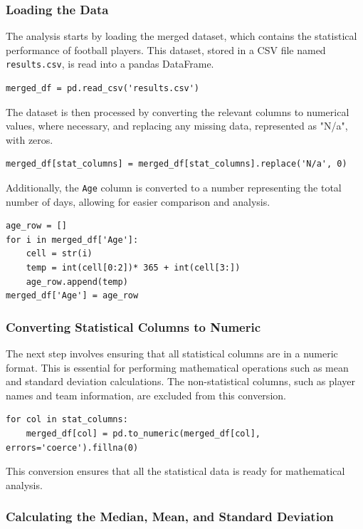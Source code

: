 \documentclass[a4paper,12pt]{article}
\begin{document}
\subsubsection{Loading the Data}

The analysis starts by loading the merged dataset, which contains the statistical performance of football players. This dataset, stored in a CSV file named \texttt{results.csv}, is read into a pandas DataFrame.

\begin{verbatim}
merged_df = pd.read_csv('results.csv')
\end{verbatim}

The dataset is then processed by converting the relevant columns to numerical values, where necessary, and replacing any missing data, represented as "N/a", with zeros.

\begin{verbatim}
merged_df[stat_columns] = merged_df[stat_columns].replace('N/a', 0)
\end{verbatim}

Additionally, the \texttt{Age} column is converted to a number representing the total number of days, allowing for easier comparison and analysis.

\begin{verbatim}
age_row = []
for i in merged_df['Age']:
    cell = str(i)
    temp = int(cell[0:2])* 365 + int(cell[3:])
    age_row.append(temp)
merged_df['Age'] = age_row
\end{verbatim}

\subsubsection{Converting Statistical Columns to Numeric}

The next step involves ensuring that all statistical columns are in a numeric format. This is essential for performing mathematical operations such as mean and standard deviation calculations. The non-statistical columns, such as player names and team information, are excluded from this conversion.

\begin{verbatim}
for col in stat_columns:
    merged_df[col] = pd.to_numeric(merged_df[col], errors='coerce').fillna(0)
\end{verbatim}

This conversion ensures that all the statistical data is ready for mathematical analysis.

\subsubsection{Calculating the Median, Mean, and Standard Deviation}
\end{document}
